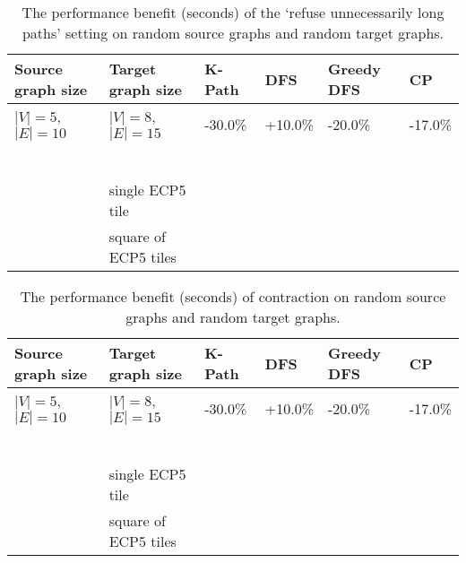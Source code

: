 \begin{table}[ht]
\centering
\begin{tabular}{|l|l|l|l|l|l|}
\hline
\textbf{Source graph size} & \textbf{Target graph size} & \textbf{K-Path} & \textbf{DFS} & \textbf{Greedy DFS} & \textbf{CP} \\ \hline
$|V|=5$, $|E|=10$          & $|V|=8$, $|E|=15$          & -30.0\%                     & +10.0\%          &  -20.0\%                      & -17.0\%               \\ \hline
&&&&&\\\hline
&&&&&\\\hline
&&&&&\\\hline
&&&&&\\\hline
&&&&&\\\hline
&&&&&\\\hline
                           & single ECP5 tile         &                           &                &                        &                \\ \hline
                                                      & square of ECP5 tiles         &                           &                &                        &                \\ \hline
\end{tabular}
\caption{The performance benefit (seconds) of the `refuse unnecessarily long paths' setting on random source graphs and random target graphs.}
\label{tab:refuselongerpaths-performance}
\end{table}



\begin{table}[ht]
\centering
\begin{tabular}{|l|l|l|l|l|l|}
\hline
\textbf{Source graph size} & \textbf{Target graph size} & \textbf{K-Path} & \textbf{DFS} & \textbf{Greedy DFS} & \textbf{CP} \\ \hline
$|V|=5$, $|E|=10$          & $|V|=8$, $|E|=15$          & -30.0\%                     & +10.0\%          &  -20.0\%                      & -17.0\%               \\ \hline
&&&&&\\\hline
&&&&&\\\hline
&&&&&\\\hline
&&&&&\\\hline
&&&&&\\\hline
&&&&&\\\hline
                           & single ECP5 tile         &                           &                &                        &                \\ \hline
                                                      & square of ECP5 tiles         &                           &                &                        &                \\ \hline
\end{tabular}
\caption{The performance benefit (seconds) of contraction on random source graphs and random target graphs.}
\label{tab:contraction-performance}
\end{table}




